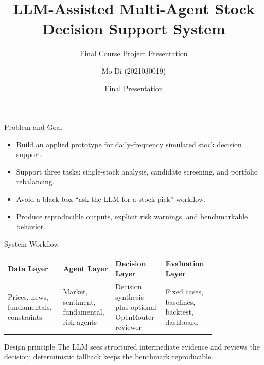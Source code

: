 \documentclass[aspectratio=169]{beamer}
\title[LLM Stock Agent]{LLM-Assisted Multi-Agent Stock Decision Support System}
\subtitle{Final Course Project Presentation}
\author{Mo Di (2021030019)}
\institute{Representation and Reasoning: Foundations of Large Models}
\date{Final Presentation}
\begin{document}
\begin{frame}
  \titlepage
\end{frame}

\begin{frame}{Problem and Goal}
  \begin{itemize}
    \item Build an applied prototype for daily-frequency simulated stock decision support.
    \item Support three tasks: single-stock analysis, candidate screening, and portfolio rebalancing.
    \item Avoid a black-box ``ask the LLM for a stock pick'' workflow.
    \item Produce reproducible outputs, explicit risk warnings, and benchmarkable behavior.
  \end{itemize}
\end{frame}

\begin{frame}{System Workflow}
  \begin{center}
  \begin{tabular}{>{\centering\arraybackslash}p{0.20\linewidth}
                  >{\centering\arraybackslash}p{0.20\linewidth}
                  >{\centering\arraybackslash}p{0.20\linewidth}
                  >{\centering\arraybackslash}p{0.20\linewidth}}
    \toprule
    Data Layer & Agent Layer & Decision Layer & Evaluation Layer \\
    \midrule
    Prices, news, fundamentals, constraints
    &
    Market, sentiment, fundamental, risk agents
    &
    Decision synthesis plus optional OpenRouter reviewer
    &
    Fixed cases, baselines, backtest, dashboard \\
    \bottomrule
  \end{tabular}
  \end{center}
  \vspace{0.6em}
  \begin{block}{Design principle}
    The LLM sees structured intermediate evidence and reviews the decision; deterministic fallback keeps the benchmark reproducible.
  \end{block}
\end{frame}
\end{document}
